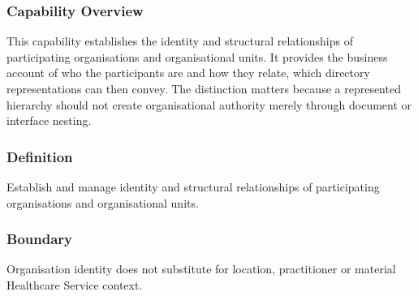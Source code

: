 \subsubsection*{Capability Overview}

This capability establishes the identity and structural relationships of participating organisations and organisational units. It provides the business account of who the participants are and how they relate, which directory representations can then convey. The distinction matters because a represented hierarchy should not create organisational authority merely through document or interface nesting.

\subsubsection*{Definition}

Establish and manage identity and structural relationships of participating organisations and organisational units.

\subsubsection*{Boundary}

Organisation identity does not substitute for location, practitioner or material Healthcare Service context.

